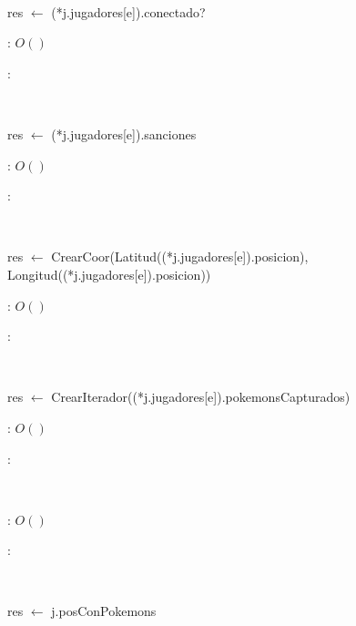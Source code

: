 \begin{Algoritmos}
	~

	\begin{algorithm}[H]
		\NoCaptionOfAlgo
		\caption{}
		res $\leftarrow$ (*j.jugadores[e]).conectado?\;
	\end{algorithm}

	\complejidad: $O()$

	\justifcomp:

	~

	\begin{algorithm}[H]
		\NoCaptionOfAlgo
		\caption{}
		res $\leftarrow$ (*j.jugadores[e]).sanciones\;
	\end{algorithm}

	\complejidad: $O()$

	\justifcomp:

	~

	\begin{algorithm}[H]
		\NoCaptionOfAlgo
		\caption{}
		res $\leftarrow$ CrearCoor(Latitud((*j.jugadores[e]).posicion), Longitud((*j.jugadores[e]).posicion))\;
	\end{algorithm}

	\complejidad: $O()$

	\justifcomp:

	~

	\begin{algorithm}[H]
		\NoCaptionOfAlgo
		\caption{}
		res $\leftarrow$ CrearIterador((*j.jugadores[e]).pokemonsCapturados)\;
	\end{algorithm}

	\complejidad: $O()$

	\justifcomp:

	~

	\begin{algorithm}[H]
		\NoCaptionOfAlgo
		\caption{}
	\end{algorithm}

	\complejidad: $O()$

	\justifcomp:

	~

	\begin{algorithm}[H]
		\NoCaptionOfAlgo
		\caption{}
		res $\leftarrow$ j.posConPokemons\;
	\end{algorithm}


\end{Algoritmos}
